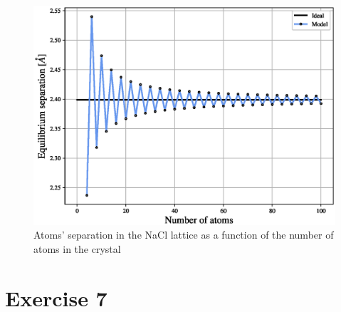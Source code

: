 \documentclass{article}
\begin{document}
\begin{figure}
    \centering 
    \includegraphics[scale=0.7]{figures/NaCl_constant.eps}
    \caption{Atoms' separation in the NaCl lattice as a function of the number of atoms in the crystal}
    \label{fig:NaCl_constant}
\end{figure}

\section*{Exercise 7}
\end{document}

